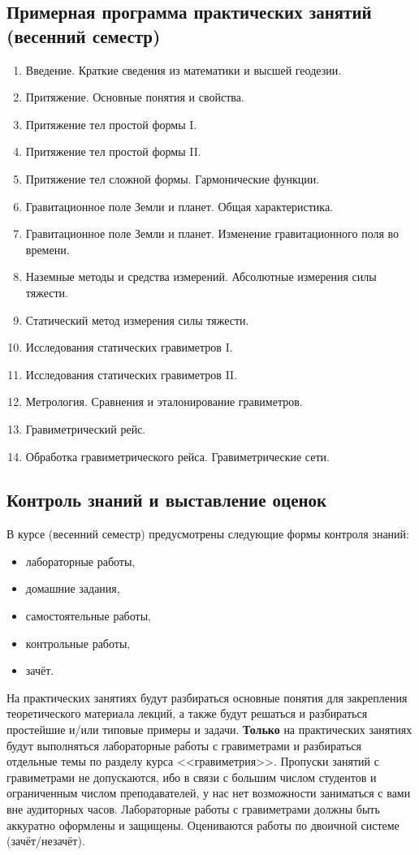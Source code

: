 \documentclass[11pt, a4paper]{article}
\theoremstyle{plain}
\theoremstyle{definition}
\theoremstyle{remark}
\begin{document}
\subsection{Примерная программа практических занятий (весенний семестр)}
\begin{enumerate}
    \item Введение. Краткие сведения из математики и высшей геодезии.
    \item Притяжение. Основные понятия и свойства.
    \item Притяжение тел простой формы I.
    \item Притяжение тел простой формы II.
    \item Притяжение тел сложной формы. Гармонические функции.
    \item Гравитационное поле Земли и планет. Общая характеристика.
    \item Гравитационное поле Земли и планет. Изменение гравитационного поля во времени.
    \item Наземные методы и средства измерений. Абсолютные измерения силы тяжести.
    \item Статический метод измерения силы тяжести.
    \item Исследования статических гравиметров I.
    \item Исследования статических гравиметров II.
    \item Метрология. Сравнения и эталонирование гравиметров.
    \item Гравиметрический рейс.
    \item Обработка гравиметрического рейса. Гравиметрические сети.
\end{enumerate}

\subsection{Контроль знаний и выставление оценок}
В курсе (весенний семестр) предусмотрены следующие формы контроля знаний: 
\begin{itemize}
    \item лабораторные работы,
    \item домашние задания,
    \item самостоятельные работы,
    \item контрольные работы,
    \item зачёт.
\end{itemize}

На практических занятиях будут разбираться основные понятия для закрепления теоретического материала
лекций, а также будут решаться и разбираться простейшие и/или типовые примеры и задачи.
\textbf{Только} на
практических занятиях будут выполняться лабораторные работы с гравиметрами и разбираться отдельные
темы по разделу курса <<гравиметрия>>. Пропуски занятий с гравиметрами не допускаются, ибо в связи с
большим числом студентов и ограниченным числом преподавателей, у нас нет возможности заниматься с
вами вне аудиторных часов. Лабораторные работы с гравиметрами должны быть аккуратно оформлены и
защищены. Оцениваются работы по двоичной системе (зачёт/незачёт).
\end{document}
